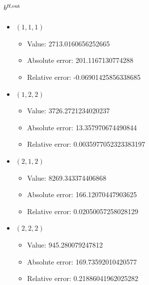 \documentclass{article}%
\begin{document}
\subsection{$b^{\textsl{H},\text{out}}$}%
\begin{itemize}%
	\item $(1, 1, 1)$%
	\begin{itemize}%
		\item Value: 2713.0160656252665%
		\item Absolute error: 201.1167130774288%
		\item Relative error: -0.06901425856338685%
	\end{itemize}%
	\item $(1, 2, 2)$%
	\begin{itemize}%
		\item Value: 3726.2721234020237%
		\item Absolute error: 13.357970674490844%
		\item Relative error: 0.0035977052323383197%
	\end{itemize}%
	\item $(2, 1, 2)$%
	\begin{itemize}%
		\item Value: 8269.343374406868%
		\item Absolute error: 166.12070447903625%
		\item Relative error: 0.02050057258028129%
	\end{itemize}%
	\item $(2, 2, 2)$%
	\begin{itemize}%
		\item Value: 945.280079247812%
		\item Absolute error: 169.73592010420577%
		\item Relative error: 0.21886041962025282%
	\end{itemize}%
\end{itemize}%
\end{document}
